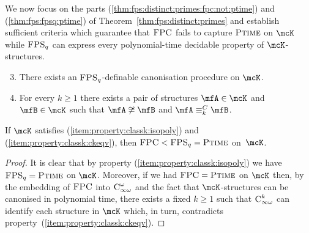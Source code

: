 \documentclass[a4paper,UKenglish]{lipics}
\newcommand{\nisom}{\not\cong}
\newcommand{\logic}[1]{\ensuremath{\textsc{#1}}\xspace}
\newcommand{\FPC}{\logic{FPC}}
\newcommand{\FPSx}[1]{\ensuremath{\logic{FPS}_{#1}}\xspace}
\newcommand{\INFCk}{\ensuremath{\logic{C}^k_{\infty\omega}}\xspace}
\newcommand{\INFCkx}[1]{\ensuremath{\logic{C}^{#1}_{\infty\omega}}\xspace}
\newcommand{\Ckeqv}{\ensuremath{\equiv^C_k}\xspace}
\newcommand{\compclass}[1]{\ensuremath{\textsc{#1}}\xspace}
\newcommand{\PTIME}{\compclass{Ptime}}
\theoremstyle{plain}
\begin{document}
\bigskip
We now focus on the parts 
(\ref{thm:fps:distinct:primes:fpc:not:ptime})
and 
(\ref{thm:fps:fpsq:ptime})
of Theorem~\ref{thm:fps:distinct:primes} and establish sufficient criteria 
which guarantee that $\FPC$ fails to capture $\PTIME$ on 
$\mcK$ while $\FPSx q$ can express every polynomial-time decidable 
property of $\mcK$-structures.

\begin{enumerate}[$(I)$]
\setcounter{enumi}{2}
 \item There exists an $\FPSx q$-definable canonisation procedure on $\mcK$.
\label{item:property:classk:isopoly}
 \item For every $k \geq 1$ there exists a pair of structures $\mfA \in 
\mcK$ and $\mfB \in \mcK$ such that $\mfA \nisom \mfB$ and $\mfA \Ckeqv 
\mfB$.
\label{item:property:classk:ckeqv}
\end{enumerate}
\begin{lemma}\label{lemma:fps:fpc:prop34}
 If $\mcK$ satisfies  (\ref{item:property:classk:isopoly}) and
 (\ref{item:property:classk:ckeqv}), then $\FPC < \FPSx q = \PTIME$ on~$\mcK$.
\end{lemma}
\begin{proof}
It is clear that by property (\ref{item:property:classk:isopoly}) we have
 $\FPSx q = \PTIME$ on $\mcK$.
 Moreover, if we had $\FPC = \PTIME$ on $\mcK$ then,  by the embedding of 
$\FPC$ 
into $\INFCkx{\omega}$ and the fact that $\mcK$-structures can be canonised in 
polynomial time, there exists a fixed $k\geq 1$ such that $\INFCk$ can identify 
each structure in $\mcK$ which, in turn, contradicts 
property~(\ref{item:property:classk:ckeqv}).
\end{proof}
\end{document}
